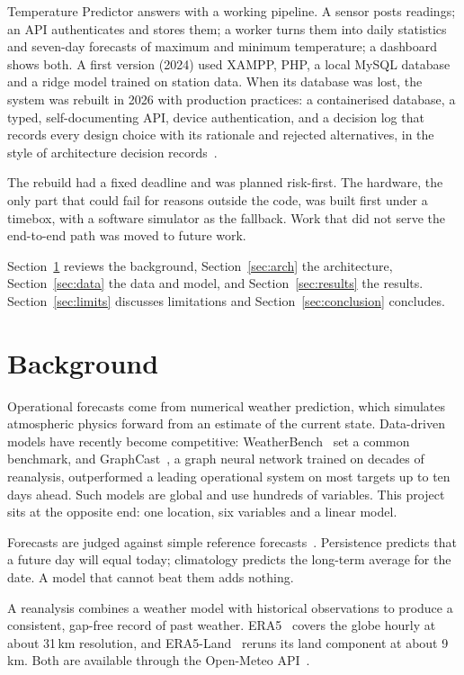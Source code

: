\documentclass[conference]{IEEEtran}
\begin{document}
Temperature Predictor answers with a working pipeline. A sensor posts readings; an API authenticates and stores them; a worker turns them into daily statistics and seven-day forecasts of maximum and minimum temperature; a dashboard shows both. A first version (2024) used XAMPP, PHP, a local MySQL database and a ridge model trained on station data. When its database was lost, the system was rebuilt in 2026 with production practices: a containerised database, a typed, self-documenting API, device authentication, and a decision log that records every design choice with its rationale and rejected alternatives, in the style of architecture decision records~\cite{b1}.

The rebuild had a fixed deadline and was planned risk-first. The hardware, the only part that could fail for reasons outside the code, was built first under a timebox, with a software simulator as the fallback. Work that did not serve the end-to-end path was moved to future work.

Section~\ref{sec:background} reviews the background, Section~\ref{sec:arch} the architecture, Section~\ref{sec:data} the data and model, and Section~\ref{sec:results} the results. Section~\ref{sec:limits} discusses limitations and Section~\ref{sec:conclusion} concludes.

\section{Background}
\label{sec:background}

Operational forecasts come from numerical weather prediction, which simulates atmospheric physics forward from an estimate of the current state. Data-driven models have recently become competitive: WeatherBench~\cite{b2} set a common benchmark, and GraphCast~\cite{b3}, a graph neural network trained on decades of reanalysis, outperformed a leading operational system on most targets up to ten days ahead. Such models are global and use hundreds of variables. This project sits at the opposite end: one location, six variables and a linear model.

Forecasts are judged against simple reference forecasts~\cite{b4,b5}. Persistence predicts that a future day will equal today; climatology predicts the long-term average for the date. A model that cannot beat them adds nothing.

A reanalysis combines a weather model with historical observations to produce a consistent, gap-free record of past weather. ERA5~\cite{b6} covers the globe hourly at about 31\,km resolution, and ERA5-Land~\cite{b7} reruns its land component at about 9\,km. Both are available through the Open-Meteo API~\cite{b8}.
\end{document}

